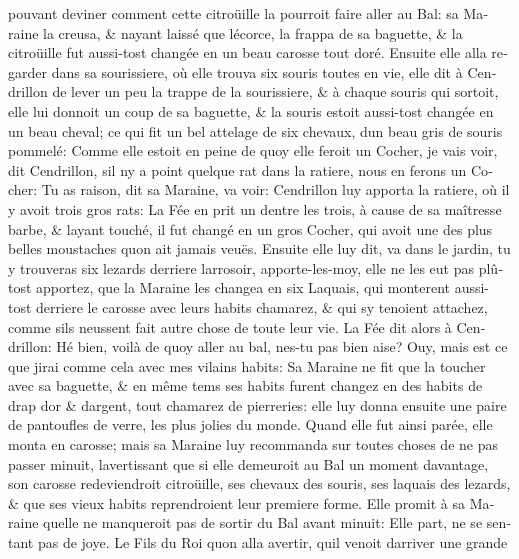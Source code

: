 \documentclass[14pt,a4paper]{memoir}
\begin{document}
\begin{otherlanguage}{french}
pouvant deviner comment cette citroüille la pourroit faire aller au Bal:
sa Maraine la creusa, \& n\textquotesingle ayant laissé que
l\textquotesingle écorce, la frappa de sa baguette, \& la citroüille fut
aussi-tost changée en un beau carosse tout doré. Ensuite elle alla
regarder dans sa sourissiere, où elle trouva six souris toutes en vie,
elle dit à Cendrillon de lever un peu la trappe de la sourissiere, \& à
chaque souris qui sortoit, elle lui donnoit un coup de sa baguette, \&
la souris estoit aussi-tost changée en un beau cheval; ce qui fit un bel
attelage de six chevaux, d\textquotesingle un beau gris de souris
pommelé: Comme elle estoit en peine de quoy elle feroit un Cocher, je
vais voir, dit Cendrillon, s\textquotesingle il n\textquotesingle y a
point quelque rat dans la ratiere, nous en ferons un Cocher: Tu as
raison, dit sa Maraine, va voir: Cendrillon luy apporta la ratiere, où
il y avoit trois gros rats: La Fée en prit un d\textquotesingle entre
les trois, à cause de sa maîtresse barbe, \& l\textquotesingle ayant
touché, il fut changé en un gros Cocher, qui avoit une des plus belles
moustaches qu\textquotesingle on ait jamais veuës. Ensuite elle luy dit,
va dans le jardin, tu y trouveras six lezards derriere
l\textquotesingle arrosoir, apporte-les-moy, elle ne les eut pas plûtost
apportez, que la Maraine les changea en six Laquais, qui monterent
aussi-tost derriere le carosse avec leurs habits chamarez, \& qui
s\textquotesingle y tenoient attachez, comme s\textquotesingle ils
n\textquotesingle eussent fait autre chose de toute leur vie. La Fée dit
alors à Cendrillon: Hé bien, voilà de quoy aller au bal,
n\textquotesingle es-tu pas bien aise? Ouy, mais est ce que
j\textquotesingle irai comme cela avec mes vilains habits: Sa Maraine ne
fit que la toucher avec sa baguette, \& en même tems ses habits furent
changez en des habits de drap d\textquotesingle or \&
d\textquotesingle argent, tout chamarez de pierreries: elle luy donna
ensuite une paire de pantoufles de verre, les plus jolies du monde.
Quand elle fut ainsi parée, elle monta en carosse; mais sa Maraine luy
recommanda sur toutes choses de ne pas passer minuit,
l\textquotesingle avertissant que si elle demeuroit au Bal un moment
davantage, son carosse redeviendroit citroüille, ses chevaux des souris,
ses laquais des lezards, \& que ses vieux habits reprendroient leur
premiere forme. Elle promit à sa Maraine qu\textquotesingle elle ne
manqueroit pas de sortir du Bal avant minuit: Elle part, ne se sentant
pas de joye. Le Fils du Roi qu\textquotesingle on alla avertir,
qu\textquotesingle il venoit d\textquotesingle arriver une grande

\end{otherlanguage}
\end{document}
